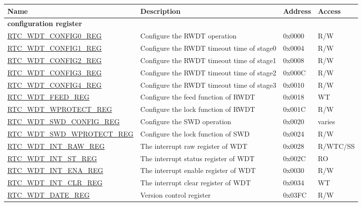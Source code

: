 \begin{longtable}{ | p{6cm} | p{7cm} | p{1.3cm} | p{1.5cm} | }
\hline\rowcolor{lightgray}
\textbf{Name} & \textbf{Description} &  \textbf{Address} & \textbf{Access} \\ \hline
\endhead
\multicolumn{4}{|l|}{\textbf{configuration register}} \\ \hline
\hyperref[regdesc:RTCWDTCONFIG0REG]{RTC\_WDT\_CONFIG0\_REG} & Configure the RWDT operation & 0x0000 & R/W \\ \hline
\hyperref[regdesc:RTCWDTCONFIG1REG]{RTC\_WDT\_CONFIG1\_REG} & Configure the RWDT timeout time of stage0 & 0x0004 & R/W \\ \hline
\hyperref[regdesc:RTCWDTCONFIG2REG]{RTC\_WDT\_CONFIG2\_REG} & Configure the RWDT timeout time of stage1 & 0x0008 & R/W \\ \hline
\hyperref[regdesc:RTCWDTCONFIG3REG]{RTC\_WDT\_CONFIG3\_REG} & Configure the RWDT timeout time of stage2 & 0x000C & R/W \\ \hline
\hyperref[regdesc:RTCWDTCONFIG4REG]{RTC\_WDT\_CONFIG4\_REG} & Configure the RWDT timeout time of stage3 & 0x0010 & R/W \\ \hline
\hyperref[regdesc:RTCWDTFEEDREG]{RTC\_WDT\_FEED\_REG} & Configure the feed function of RWDT & 0x0018 & WT \\ \hline
\hyperref[regdesc:RTCWDTWPROTECTREG]{RTC\_WDT\_WPROTECT\_REG} & Configure the lock function of RWDT & 0x001C & R/W \\ \hline
\hyperref[regdesc:RTCWDTSWDCONFIGREG]{RTC\_WDT\_SWD\_CONFIG\_REG} & Configure the SWD operation & 0x0020 & varies \\ \hline
\hyperref[regdesc:RTCWDTSWDWPROTECTREG]{RTC\_WDT\_SWD\_WPROTECT\_REG} & Configure the lock function of SWD & 0x0024 & R/W \\ \hline
\hyperref[regdesc:RTCWDTINTRAWREG]{RTC\_WDT\_INT\_RAW\_REG} & The interrupt raw register of WDT & 0x0028 & R/WTC/SS \\ \hline
\hyperref[regdesc:RTCWDTINTSTREG]{RTC\_WDT\_INT\_ST\_REG} & The interrupt status register of WDT & 0x002C & RO \\ \hline
\hyperref[regdesc:RTCWDTINTENAREG]{RTC\_WDT\_INT\_ENA\_REG} & The interrupt enable register of WDT & 0x0030 & R/W \\ \hline
\hyperref[regdesc:RTCWDTINTCLRREG]{RTC\_WDT\_INT\_CLR\_REG} & The interrupt clear register of WDT & 0x0034 & WT \\ \hline
\hyperref[regdesc:RTCWDTDATEREG]{RTC\_WDT\_DATE\_REG} & Version control register & 0x03FC & R/W \\ \hline
\end{longtable}
